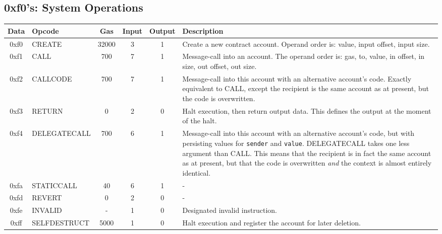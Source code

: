 \documentclass[10pt,letterpaper,leqno,bibliography=totoc]{scrartcl}
\newenvironment{alphafootnotes}
{\par\edef\savedfootnotenumber{\number\value{footnote}}
\renewcommand{\thefootnote}{\alph{footnote}}
\setcounter{footnote}{0}}
{\par\setcounter{footnote}{\savedfootnotenumber}}
\begin{document}
\begin{alphafootnotes}
	        \subsection{0xf0's: System Operations}
			\begin{longtable}{|cP{2.8cm}cccp{6cm}|}
		        \hline  
	        \textbf{Data} & \textbf{Opcode} & \textbf{Gas}  & \textbf{Input}  & \textbf{Output} & \textbf{Description} \\
			\hline  
			0xf0 & CREATE & 32000 & 3 & 1 & Create a new contract account. Operand order is: value, input offset, input size. \\
			0xf1 & CALL & 700 & 7 & 1 & Message-call into an account. The operand order is: gas, to, value, in offset, in size, out offset, out size. \\
			0xf2 & CALLCODE & 700 & 7 & 1 & Message-call into this account with an alternative account's code. Exactly equivalent to CALL, except the recipient is the same account as at present, but the code is overwritten. \\
			0xf3 & RETURN & 0 & 2 & 0 & Halt execution, then return output data. This defines the output at the moment of the halt. \\
			0xf4 & DELEGATECALL & 700 & 6 & 1 & Message-call into this account with an alternative account's code, but with persisting values for \texttt{sender} and \texttt{value}. DELEGATECALL takes one less argument than CALL. This means that the recipient is in fact the same account as at present, but that the code is overwritten \textit{and} the context is almost entirely identical. \\
			0xfa & STATICCALL & 40 & 6 & 1 & - \\
			0xfd & REVERT & 0 & 2 & 0 & - \\
			0xfe & INVALID & - & 1 & 0 & Designated invalid instruction. \\
			0xff & SELFDESTRUCT & 5000 & 1 & 0 & Halt execution and register the account for later deletion. \\
			\hline
			\end{longtable}



\clearpage
\begin{multicols*}{2}
\printbibliography
\clearpage
\printglossary[type=\acronymtype]
\glsaddall
\printnoidxglossaries
\clearpage
\end{multicols*}
\end{alphafootnotes}

\printindex
\end{document}
